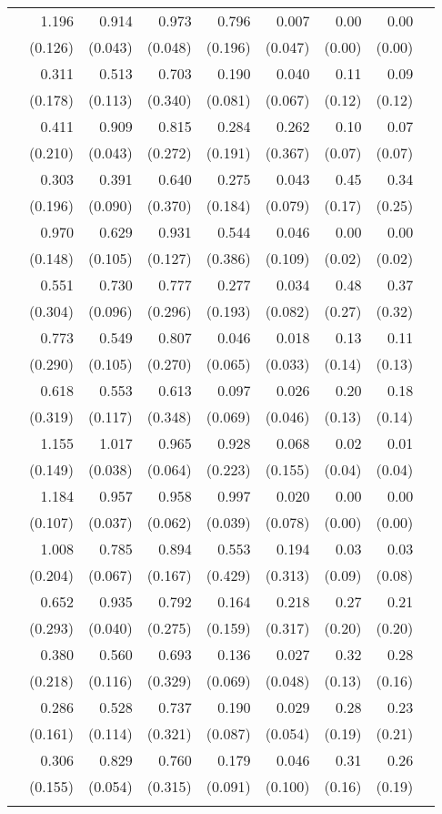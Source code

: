 \begin{longtable}{rrrrrrrrr}
\addlinespace[0.05cm] 112&1.196&0.914&0.973&0.796&0.007&0.00&0.00\\&(0.126)&(0.043)&(0.048)&(0.196)&(0.047)&(0.00)&(0.00) \\ \addlinespace[0.05cm] 113&0.311&0.513&0.703&0.190&0.040&0.11&0.09\\&(0.178)&(0.113)&(0.340)&(0.081)&(0.067)&(0.12)&(0.12) \\ \addlinespace[0.05cm] 114&0.411&0.909&0.815&0.284&0.262&0.10&0.07\\&(0.210)&(0.043)&(0.272)&(0.191)&(0.367)&(0.07)&(0.07) \\ \addlinespace[0.05cm] 115&0.303&0.391&0.640&0.275&0.043&0.45&0.34\\&(0.196)&(0.090)&(0.370)&(0.184)&(0.079)&(0.17)&(0.25) \\ \addlinespace[0.05cm] 116&0.970&0.629&0.931&0.544&0.046&0.00&0.00\\&(0.148)&(0.105)&(0.127)&(0.386)&(0.109)&(0.02)&(0.02) \\ \addlinespace[0.05cm] 117&0.551&0.730&0.777&0.277&0.034&0.48&0.37\\&(0.304)&(0.096)&(0.296)&(0.193)&(0.082)&(0.27)&(0.32) \\ \addlinespace[0.05cm] 118&0.773&0.549&0.807&0.046&0.018&0.13&0.11\\&(0.290)&(0.105)&(0.270)&(0.065)&(0.033)&(0.14)&(0.13) \\ \addlinespace[0.05cm] 119&0.618&0.553&0.613&0.097&0.026&0.20&0.18\\&(0.319)&(0.117)&(0.348)&(0.069)&(0.046)&(0.13)&(0.14) \\ \addlinespace[0.05cm] 120&1.155&1.017&0.965&0.928&0.068&0.02&0.01\\&(0.149)&(0.038)&(0.064)&(0.223)&(0.155)&(0.04)&(0.04) \\ \addlinespace[0.05cm] 121&1.184&0.957&0.958&0.997&0.020&0.00&0.00\\&(0.107)&(0.037)&(0.062)&(0.039)&(0.078)&(0.00)&(0.00) \\ \addlinespace[0.05cm] 122&1.008&0.785&0.894&0.553&0.194&0.03&0.03\\&(0.204)&(0.067)&(0.167)&(0.429)&(0.313)&(0.09)&(0.08) \\ \addlinespace[0.05cm] 123&0.652&0.935&0.792&0.164&0.218&0.27&0.21\\&(0.293)&(0.040)&(0.275)&(0.159)&(0.317)&(0.20)&(0.20) \\ \addlinespace[0.05cm] 124&0.380&0.560&0.693&0.136&0.027&0.32&0.28\\&(0.218)&(0.116)&(0.329)&(0.069)&(0.048)&(0.13)&(0.16) \\ \addlinespace[0.05cm] 125&0.286&0.528&0.737&0.190&0.029&0.28&0.23\\&(0.161)&(0.114)&(0.321)&(0.087)&(0.054)&(0.19)&(0.21) \\ \addlinespace[0.05cm] 126&0.306&0.829&0.760&0.179&0.046&0.31&0.26\\&(0.155)&(0.054)&(0.315)&(0.091)&(0.100)&(0.16)&(0.19) \\ \addlinespace[0.05cm] 
\end{longtable}

